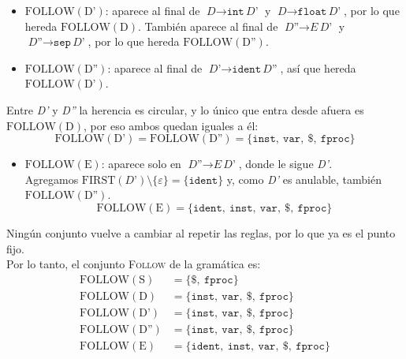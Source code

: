 \documentclass[12pt,letterpaper]{article}
\newcommand{\nt}[1]{\textit{#1}}
\newcommand{\tk}[1]{\texttt{#1}}
\newcommand{\tx}[1]{\text{#1}}
\newcommand{\First}[1]{\mathrm{FIRST}(#1)}
\newcommand{\Follow}[1]{\mathrm{FOLLOW}(#1)}
\newcommand{\eps}{\varepsilon}
\begin{document}
\begin{enumerate}[label=\arabic*.]
\begin{itemize}
\begin{itemize}
    \item $\Follow{\tx{D'}}$: aparece al final de $\nt{D}\to\tk{int}\,\nt{D'}$ y
      $\nt{D}\to\tk{float}\,\nt{D'}$, por lo que hereda $\Follow{\tx{D}}$. También aparece al final de
      $\nt{D''}\to\nt{E}\,\nt{D'}$ y $\nt{D''}\to\tk{sep}\,\nt{D'}$, por lo que hereda $\Follow{\tx{D''}}$.

    \item $\Follow{\tx{D''}}$: aparece al final de $\nt{D'}\to\tk{ident}\,\nt{D''}$, así que hereda
      $\Follow{\tx{D'}}$.
    \end{itemize}
    
    Entre \nt{D'} y \nt{D''} la herencia es circular, y lo único que entra desde afuera es $\Follow{\tx{D}}$,
    por eso ambos quedan iguales a él:
    \[
    \Follow{\tx{D'}} = \Follow{\tx{D''}} = \{\tk{inst},\ \tk{var},\ \tk{\$},\ \tk{fproc}\}
    \]
    
    \begin{itemize}
    \item $\Follow{\tx{E}}$: aparece solo en $\nt{D''}\to\nt{E}\,\nt{D'}$, donde le sigue \nt{D'}.\\
      Agregamos $\First{\nt{D'}}\setminus\{\eps\}=\{\tk{ident}\}$ y, como \nt{D'} es anulable, también
      $\Follow{\tx{D''}}$.
      \[
      \Follow{\tx{E}} = \{\tk{ident},\ \tk{inst},\ \tk{var},\ \tk{\$},\ \tk{fproc}\}
      \]
    \end{itemize}
    Ningún conjunto vuelve a cambiar al repetir las reglas, por lo que ya es el punto fijo.\\

    Por lo tanto, el conjunto \textsc{Follow} de la gramática es:
    \[
    \begin{aligned}
      \Follow{\tx{S}}   &= \{\tk{\$},\ \tk{fproc}\} \\
      \Follow{\tx{D}}   &= \{\tk{inst},\ \tk{var},\ \tk{\$},\ \tk{fproc}\} \\
      \Follow{\tx{D'}}  &= \{\tk{inst},\ \tk{var},\ \tk{\$},\ \tk{fproc}\} \\
      \Follow{\tx{D''}} &= \{\tk{inst},\ \tk{var},\ \tk{\$},\ \tk{fproc}\} \\
      \Follow{\tx{E}}   &= \{\tk{ident},\ \tk{inst},\ \tk{var},\ \tk{\$},\ \tk{fproc}\}
    \end{aligned}
    \]

    \bigskip


\end{itemize}
\end{enumerate}
\end{document}
